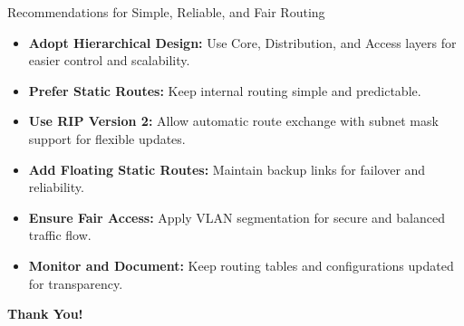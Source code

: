 \documentclass[aspectratio=169]{beamer}
\begin{document}
\begin{frame}{Recommendations for Simple, Reliable, and Fair Routing}
\begin{itemize}
    \item \textbf{Adopt Hierarchical Design:} Use Core, Distribution, and Access layers for easier control and scalability.
    \vspace{6pt}
    \item \textbf{Prefer Static Routes:} Keep internal routing simple and predictable.
    \vspace{6pt}
    \item \textbf{Use RIP Version 2:} Allow automatic route exchange with subnet mask support for flexible updates.
    \vspace{6pt}
    \item \textbf{Add Floating Static Routes:} Maintain backup links for failover and reliability.
    \vspace{6pt}
    \item \textbf{Ensure Fair Access:} Apply VLAN segmentation for secure and balanced traffic flow.
    \vspace{6pt}
    \item \textbf{Monitor and Document:} Keep routing tables and configurations updated for transparency.
\end{itemize}
\end{frame}
\begin{frame}
\centering
\Huge \textbf{Thank You!}
\end{frame}
\end{document}
